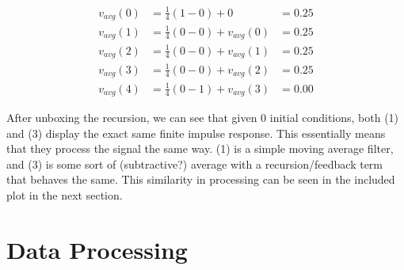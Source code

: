 \documentclass[]{report}
\begin{document}
	\begin{align*}
		v_{avg}(0) &= \frac{1}{4} (1 - 0) + 0 &= 0.25 \\
		v_{avg}(1) &= \frac{1}{4} (0 - 0) + v_{avg}(0) &= 0.25 \\
		v_{avg}(2) &= \frac{1}{4} (0 - 0) + v_{avg}(1) &= 0.25 \\
		v_{avg}(3) &= \frac{1}{4} (0 - 0) + v_{avg}(2) &= 0.25 \\
		v_{avg}(4) &= \frac{1}{4} (0 - 1) + v_{avg}(3) &= 0.00
	\end{align*}
	
	After unboxing the recursion, we can see that given 0 initial conditions, both (1) and (3) display the exact same finite impulse response. This essentially means that they process the signal the same way. (1) is a simple moving average filter, and (3) is some sort of (subtractive?) average with a recursion/feedback term that behaves the same. This similarity in processing can be seen in the included plot in the next section.

\section*{Data Processing}
\end{document}
